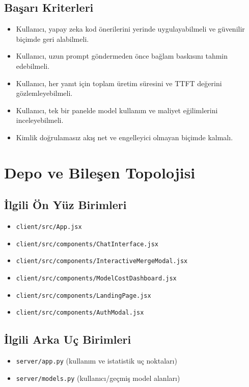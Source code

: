 \documentclass[12pt,a4paper]{article}
\begin{document}
\subsection{Başarı Kriterleri}
\begin{itemize}[leftmargin=*]
  \item Kullanıcı, yapay zeka kod önerilerini yerinde uygulayabilmeli ve güvenilir biçimde geri alabilmeli.
  \item Kullanıcı, uzun prompt göndermeden önce bağlam baskısını tahmin edebilmeli.
  \item Kullanıcı, her yanıt için toplam üretim süresini ve TTFT değerini gözlemleyebilmeli.
  \item Kullanıcı, tek bir panelde model kullanım ve maliyet eğilimlerini inceleyebilmeli.
  \item Kimlik doğrulamasız akış net ve engelleyici olmayan biçimde kalmalı.
\end{itemize}

\section{Depo ve Bileşen Topolojisi}

\subsection{İlgili Ön Yüz Birimleri}
\begin{itemize}[leftmargin=*]
  \item \texttt{client/src/App.jsx}
  \item \texttt{client/src/components/ChatInterface.jsx}
  \item \texttt{client/src/components/InteractiveMergeModal.jsx}
  \item \texttt{client/src/components/ModelCostDashboard.jsx}
  \item \texttt{client/src/components/LandingPage.jsx}
  \item \texttt{client/src/components/AuthModal.jsx}
\end{itemize}

\subsection{İlgili Arka Uç Birimleri}
\begin{itemize}[leftmargin=*]
  \item \texttt{server/app.py} (kullanım ve istatistik uç noktaları)
  \item \texttt{server/models.py} (kullanıcı/geçmiş model alanları)
\end{itemize}
\end{document}
